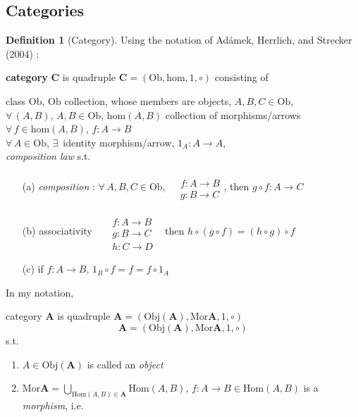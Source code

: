 \documentclass[twoside,landscape,10pt]{amsart}
\theoremstyle{plain}
\theoremstyle{definition}
\newtheorem{definition}{Definition}
\theoremstyle{remark}
\begin{document}
\begin{multicols*}{2}
\section{Categories}

\begin{definition}[Category] Using the notation of Ad\'{a}mek, Herrlich, and Strecker (2004) \cite{AHS2004}: 

  \textbf{category} $\mathbf{C}$ is quadruple $\mathbf{C} = (\text{Ob}, \text{hom},1,\circ)$ consisting of 

class $\text{Ob}$, $\text{Ob}$ collection, whose members are objects, $A,B,C \in \text{Ob}$, \\
$\forall \, (A,B)$, $A,B \in \text{Ob}$, $\text{hom}(A,B)$ collection of morphisms/arrows \\
$\forall \, f \in \text{hom}(A,B)$, $f:A\to B$ \\
$\forall \, A \in \text{Ob}$, $\exists \, $ identity morphism/arrow, $1_A : A \to A$, \\
\emph{composition law} s.t. 
\begin{enumerate}
  \item[(a)] \emph{composition} : $\forall \, A,B,C \in \text{Ob}$, $\begin{aligned} & \quad \\
    & f:A \to B \\
    & g:B \to C \end{aligned}$, then $g\circ f: A \to C$
  \item[(b)] associativity \quad \, $\begin{aligned}  & \quad \\
    & f:A \to B \\
    & g:B \to C \\
    & h:C \to D \end{aligned}$ \quad \, then $h\circ (g\circ f) = (h\circ g) \circ f$
\item[(c)] if $f:A \to B$, $1_B \circ f = f=  f\circ 1_A$
\end{enumerate}

In my notation,

category $\mathbf{A}$ is quadruple $\mathbf{A} = (\text{Obj}(\mathbf{A}), \text{Mor}\mathbf{A}, 1,\circ)$ 
\[
\mathbf{A} = (\text{Obj}(\mathbf{A}), \text{Mor}\mathbf{A}, 1,\circ)
\]
s.t.
\begin{enumerate}
  \item $A \in \text{Obj}(\mathbf{A})$ is called an \emph{object}
  \item $\text{Mor}\mathbf{A} = \bigcup_{ \text{Hom}(A,B) \in \mathbf{A}} \text{Hom}(A,B)$, $f: A \to B \in \text{Hom}(A,B)$ is a \emph{morphism}, i.e.


\end{enumerate}
\end{definition}
\end{multicols*}
\end{document}
